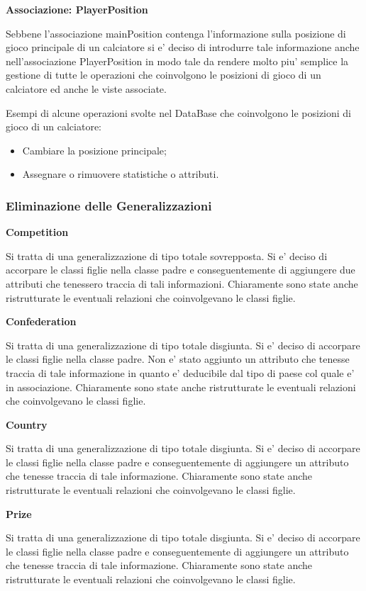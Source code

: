 \textbf{Associazione: PlayerPosition}

Sebbene l'associazione mainPosition contenga l'informazione sulla posizione di gioco principale
di un calciatore si e' deciso di introdurre tale informazione anche nell'associazione PlayerPosition
in modo tale da rendere molto piu' semplice la gestione di tutte le operazioni che coinvolgono le
posizioni di gioco di un calciatore ed anche le viste associate.

Esempi di alcune operazioni svolte nel DataBase che coinvolgono le posizioni di gioco di un calciatore:
\begin{itemize}
	\item Cambiare la posizione principale;
	\item Assegnare o rimuovere statistiche o attributi.
\end{itemize}


\newpage
\subsubsection{Eliminazione delle Generalizzazioni}

\textbf{Competition}

Si tratta di una generalizzazione di tipo totale sovrepposta. Si e' deciso di accorpare le
classi figlie nella classe padre e conseguentemente di aggiungere due attributi che tenessero traccia
di tali informazioni.
Chiaramente sono state anche ristrutturate le eventuali relazioni che coinvolgevano le classi figlie.

\textbf{Confederation}

Si tratta di una generalizzazione di tipo totale disgiunta. Si e' deciso di accorpare le
classi figlie nella classe padre. Non e' stato aggiunto un attributo che tenesse traccia
di tale informazione in quanto e' deducibile dal tipo di paese col quale e' in associazione.
Chiaramente sono state anche ristrutturate le eventuali relazioni che coinvolgevano le classi figlie.

\textbf{Country}

Si tratta di una generalizzazione di tipo totale disgiunta. Si e' deciso di accorpare le
classi figlie nella classe padre e conseguentemente di aggiungere un attributo che tenesse traccia
di tale informazione.
Chiaramente sono state anche ristrutturate le eventuali relazioni che coinvolgevano le classi figlie.

\textbf{Prize}

Si tratta di una generalizzazione di tipo totale disgiunta. Si e' deciso di accorpare le
classi figlie nella classe padre e conseguentemente di aggiungere un attributo che tenesse traccia
di tale informazione.
Chiaramente sono state anche ristrutturate le eventuali relazioni che coinvolgevano le classi figlie.


